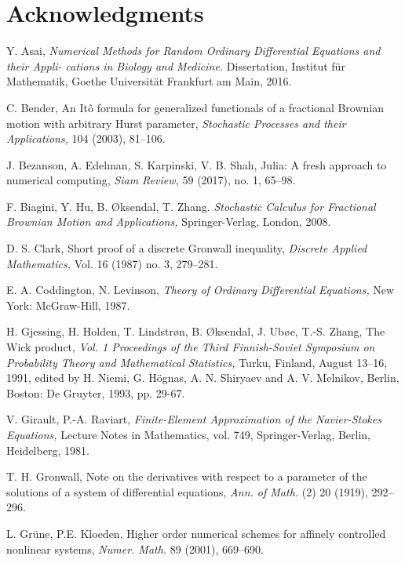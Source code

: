 \documentclass[reqno,12pt]{amsart}
\theoremstyle{plain}%
\theoremstyle{definition}
\begin{document}
\section*{Acknowledgments}

\begin{thebibliography}{25}
     Y. Asai, \emph{Numerical Methods for Random Ordinary Differential Equations and their Appli-
    cations in Biology and Medicine.} Dissertation, Institut f\"ur Mathematik, Goethe Universit\"at Frankfurt am Main, 2016. 

     C. Bender, An It\^o formula for generalized functionals of a fractional Brownian motion with arbitrary Hurst parameter, \emph{Stochastic Processes and their Applications,} 104 (2003), 81--106.

     J. Bezanson, A. Edelman, S. Karpinski, V. B. Shah, Julia: A fresh approach to numerical computing, \emph{Siam Review,} 59 (2017), no. 1, 65--98.

     F. Biagini, Y. Hu, B. {\O}ksendal, T. Zhang. \emph{Stochastic Calculus for Fractional Brownian Motion and Applications,} Springer-Verlag, London, 2008.

     D. S. Clark, Short proof of a discrete Gronwall inequality, \emph{Discrete Applied Mathematics,} Vol. 16 (1987) no. 3, 279--281.

     E. A. Coddington, N. Levinson, \emph{Theory of Ordinary Differential Equations,} New York: McGraw-Hill, 1987.

     H. Gjessing, H. Holden, T. Lindstr{\o}n, B. {\O}ksendal, J. Ub{\o}e, T.-S. Zhang, The Wick product, \emph{Vol. 1 Proceedings of the Third Finnish-Soviet Symposium on Probability Theory and Mathematical Statistics,} Turku, Finland, August 13--16, 1991, edited by H. Niemi, G. H\"ognas, A. N. Shiryaev and A. V. Melnikov, Berlin, Boston: De Gruyter, 1993, pp. 29-67.

     V. Girault, P.-A. Raviart, \emph{Finite-Element Approximation of the Navier-Stokes Equations,} Lecture Notes in Mathematics, vol. 749, Springer-Verlag, Berlin, Heidelberg, 1981.

     T. H. Gronwall, Note on the derivatives with respect to a parameter of the solutions of a system of differential equations, \emph{Ann. of Math.} (2) 20 (1919), 292--296.

     L. Gr\"une, P.E. Kloeden, Higher order numerical schemes for affinely controlled nonlinear systems, \emph{Numer. Math.} 89 (2001), 669--690.


\end{thebibliography}
\end{document}
